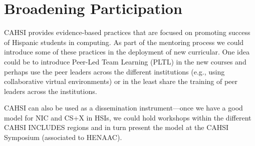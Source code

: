 \section{Broadening Participation}


CAHSI provides evidence-based practices that are focused on promoting success of Hispanic students in computing. As part of the mentoring process we could introduce some of these practices in the deployment of new curricular. One idea could be to introduce Peer-Led Team Learning (PLTL) in the new courses and perhaps use the peer leaders across the different institutions (e.g., using collaborative virtual environments) or in the least share the training of peer leaders across the institutions. 

CAHSI can also be used as a dissemination instrument---once we have a good model for NIC and CS+X in HSIs, we could hold workshops within the different CAHSI INCLUDES regions and in turn present the model at the CAHSI Symposium (associated to HENAAC).